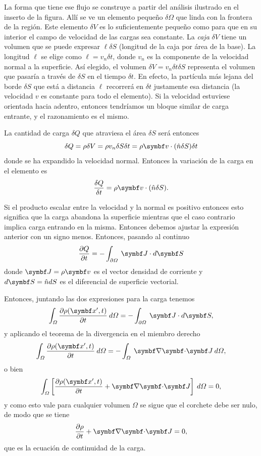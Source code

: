 \documentclass[10pt,oneside]{CBFT_book}
\begin{document}
La forma que tiene ese flujo se construye a partir del análisis ilustrado en el inserto de la figura.
Allí se ve un elemento pequeño $\delta \Omega$ que linda con la frontera de la región. Este elemento
$\delta V$ es lo suficientemente pequeño como para que en su interior el campo de velocidad de
las cargas sea constante. La {\it caja} $\delta V$ tiene un volumen que se puede expresar $\ell \delta S$
(longitud de la caja por área de la base). La longitud $\ell $ se elige como
$ \ell = v_n \delta t$, donde $v_n$ es la componente de la velocidad normal a la superficie. Así elegido, 
el volumen $\delta V = v_n \delta t \delta S$ representa el volumen que pasaría a través de $\delta S$ 
en el tiempo $\delta t$. En efecto, la partícula más lejana del borde $\delta S$ que está a distancia $\ell$ 
recorrerá en $\delta t$ justamente esa distancia (la velocidad $v$ es constante para todo el elemento).
Si la velocidad estuviese orientada hacia adentro, entonces tendríamos un bloque similar de carga 
entrante, y el razonamiento es el mismo.

La cantidad de carga $\delta Q$ que atraviesa el área $\delta S$ será entonces 
\[
	\delta Q = \rho \delta V = \rho v_n \delta S \delta t = \rho \vb{v} \cdot (\hat{n} \delta S) \delta t
\]
donde se ha expandido la velocidad normal. Entonces la variación de la carga en el elemento es
\[
	\frac{\delta Q}{\delta t} = \rho \vb{v} \cdot (\hat{n} \delta S).
\]

Si el producto escalar entre la velocidad y la normal es positivo entonces esto significa que la carga
abandona la superficie mientras que el caso contrario implica carga entrando en la misma. Entonces 
debemos ajustar la expresión anterior con un signo menos. Entonces, pasando al continuo
\[
	\dpar{Q}{t} = - \int_{\partial\Omega} \: \vb{J} \cdot d\vb{S}
\]
donde $\vb{J} = \rho \vb{v}$ es el vector densidad de corriente y $d\vb{S} = \hat{n}dS$ es el diferencial
de superficie vectorial.

Entonces, juntando las dos expresiones para la carga tenemos 
\[
	\int_\Omega \dpar{\rho(\vb{x}',t)}{t} \: d\Omega = - \int_{\partial\Omega} \: \vb{J} \cdot d\vb{S},
\]
y aplicando el teorema de la divergencia en el miembro derecho
\[
	\int_\Omega \dpar{\rho(\vb{x}',t)}{t} \: d\Omega = - \int_\Omega \: \divem{J} \: d\Omega,
\]
o bien 
\[
	\int_\Omega \left[ \dpar{\rho(\vb{x}',t)}{t} + \divem{J} \right] \: d\Omega = 0,
\]
y como esto vale para cualquier volumen $\Omega$ se sigue que el corchete debe ser nulo, de modo que se tiene
\[
	\dpar{\rho}{t} + \divem{J} = 0,
\]
que es la ecuación de continuidad de la carga.
\end{document}
